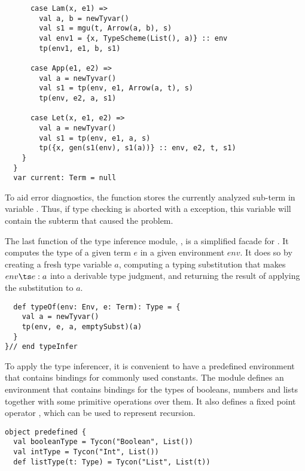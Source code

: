 {\begin{lstlisting}
      case Lam(x, e1) =>
        val a, b = newTyvar()
        val s1 = mgu(t, Arrow(a, b), s)
        val env1 = {x, TypeScheme(List(), a)} :: env
        tp(env1, e1, b, s1)

      case App(e1, e2) =>
        val a = newTyvar()
        val s1 = tp(env, e1, Arrow(a, t), s)
        tp(env, e2, a, s1)

      case Let(x, e1, e2) =>
        val a = newTyvar()
        val s1 = tp(env, e1, a, s)
        tp({x, gen(s1(env), s1(a))} :: env, e2, t, s1)
    }
  } 
  var current: Term = null
\end{lstlisting}
To aid error diagnostics, the  function stores the currently
analyzed sub-term in variable . Thus, if type checking
is aborted with a  exception, this variable will
contain the subterm that caused the problem.

The last function of the type inference module, , is a
simplified facade for . It computes the type of a given term
$e$ in a given environment $env$. It does so by creating a fresh type
variable $a$, computing a typing substitution that makes $env \ts e: a$
into a derivable type judgment, and returning
the result of applying the substitution to $a$.
\begin{lstlisting}
  def typeOf(env: Env, e: Term): Type = {
    val a = newTyvar()
    tp(env, e, a, emptySubst)(a)
  }
}// end typeInfer
\end{lstlisting}
To apply the type inferencer, it is convenient to have a predefined
environment that contains bindings for commonly used constants. The
module  defines an environment  that
contains bindings for the types of booleans, numbers and lists
together with some primitive operations over them. It also
defines a fixed point operator , which can be used to
represent recursion.
\begin{lstlisting}
object predefined {
  val booleanType = Tycon("Boolean", List())
  val intType = Tycon("Int", List())
  def listType(t: Type) = Tycon("List", List(t))


\end{lstlisting}}
